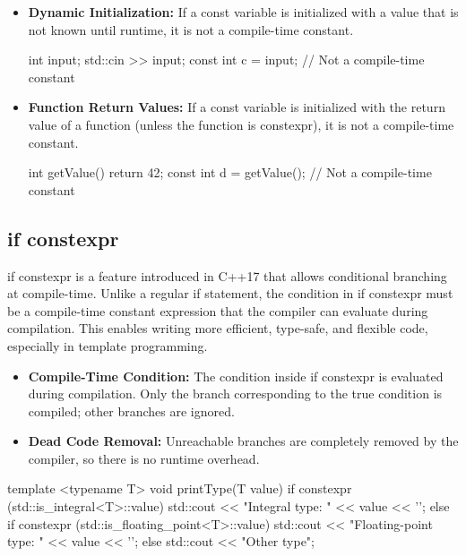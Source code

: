 \documentclass{report}
\begin{document}
\begin{itemize}
    \item \textbf{Dynamic Initialization:} If a const variable is initialized with a value that is not known until runtime, it is not a compile-time constant.
        \bigbreak \noindent 
        \begin{cppcode}
            int input;
            std::cin >> input;
            const int c = input;  // Not a compile-time constant
        \end{cppcode}
    \item \textbf{Function Return Values:} If a const variable is initialized with the return value of a function (unless the function is constexpr), it is not a compile-time constant.
        \bigbreak \noindent 
        \begin{cppcode}
            int getValue() { return 42; }
            const int d = getValue();  // Not a compile-time constant
        \end{cppcode}
\end{itemize}



\bigbreak \noindent 
\subsection{if constexpr}
\bigbreak \noindent 
if constexpr is a feature introduced in C++17 that allows conditional branching at compile-time. Unlike a regular if statement, the condition in if constexpr must be a compile-time constant expression that the compiler can evaluate during compilation. This enables writing more efficient, type-safe, and flexible code, especially in template programming.
\begin{itemize}
    \item \textbf{Compile-Time Condition:} The condition inside if constexpr is evaluated during compilation.
        \bigbreak \noindent 
        Only the branch corresponding to the true condition is compiled; other branches are ignored.
\item \textbf{Dead Code Removal:} Unreachable branches are completely removed by the compiler, so there is no runtime overhead.
\end{itemize}
\bigbreak \noindent 
\begin{cppcode}
template <typename T>
void printType(T value) {
    if constexpr (std::is_integral<T>::value) {
        std::cout << "Integral type: " << value << '\n';
    } else if constexpr (std::is_floating_point<T>::value) {
        std::cout << "Floating-point type: " << value << '\n';
    } else {
        std::cout << "Other type\n";
    }
}
\end{cppcode}
\end{document}
